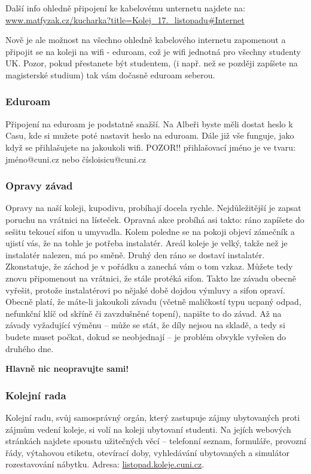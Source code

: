 Další info ohledně připojení ke kabelovému unternetu najdete na:\\
\url{www.matfyzak.cz/kucharka?title=Kolej_17._listopadu#Internet}

Nově je ale možnost na všechno ohledně kabelového internetu zapomenout a připojit se na koleji na wifi - eduroam, 
což je wifi jednotná pro všechny studenty UK. Pozor, pokud přestanete být studentem, 
(i např. než se později zapíšete na magisterské studium) tak vám dočasně eduroam seberou. 


\subsubsection{Eduroam}
Připojení na eduroam je podstatně snažší. Na Albeři byste měli dostat heslo k Casu,
kde si mužete poté nastavit heslo na eduroam. Dále již vše funguje, jako když se přihlašujete na jakoukoli wifi.
POZOR!! přihlašovací jméno je ve tvaru: jméno@cuni.cz nebo čísloisicu@cuni.cz


\subsubsection{Opravy závad}
Opravy na naší koleji, kupodivu, probíhají docela rychle. Nejdůležitější je
zapsat poruchu na vrátnici na lísteček. Opravná akce probíhá asi takto: ráno
zapíšete do sešitu tekoucí sifon u umyvadla. Kolem poledne se na pokoji objeví
zámečník a ujistí vás, že na tohle je potřeba instalatér. Areál koleje je velký,
takže než je instalatér nalezen, má po směně. Druhý den ráno se dostaví
instalatér. Zkonstatuje, že záchod je v pořádku a zanechá vám o tom vzkaz.
Můžete tedy znovu připomenout na vrátnici, že stále protéká sifon. Takto lze
závadu obecně vyřešit, protože instalatérovi po nějaké době dojdou výmluvy a
sifon opraví. Obecně platí, že máte-li jakoukoli závadu (včetně maličkostí typu
ucpaný odpad, nefunkční klíč od skříně či zavzdušněné topení), napište to do
závad. Až na závady vyžadující výměnu – může se stát, že díly nejsou na skladě,
a tedy si budete muset počkat, dokud se neobjednají – je problém obvykle vyřešen
do druhého dne.

\textbf{Hlavně nic neopravujte sami!}


\subsubsection{Kolejní rada}
Kolejní radu, svůj samosprávný orgán, který zastupuje zájmy ubytovaných proti
zájmům vedení koleje, si volí na koleji ubytovaní studenti. Na jejích webových
stránkách najdete spoustu užitečných věcí – telefonní seznam, formuláře,
provozní řády, výtahovou etiketu, otevírací doby, vyhledávání ubytovaných a
simulátor rozestavování nábytku. Adresa: \url{listopad.koleje.cuni.cz}.


